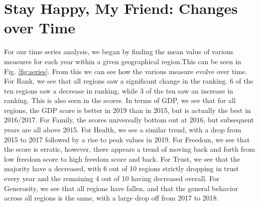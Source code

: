 \documentclass{article}
\begin{document}
\section{Stay Happy, My Friend: Changes over Time}
For our time series analysis, we began by finding the mean value of various measures for each year within a given geographical region.This can be seen in Fig. \ref{fig:series}. From this we can see how the various measure evolve over time. For Rank, we see that all regions saw a significant change in the ranking. 6 of the ten regions saw a decrease in ranking, while 3 of the ten saw an increase in ranking. This is also seen in the scores. In terms of GDP, we see that for all regions, the GDP score is better in 2019 than in 2015, but is actually the best in 2016/2017. For Family, the scores universally bottom out at 2016, but subsequent years are all above 2015. For Health, we see a similar trend, with a drop from 2015 to 2017 followed by a rise to peak values in 2019. For Freedom, we see that the score is erratic, however, there appears a trend of moving back and forth from low freedom score to high freedom score and back. For Trust, we see that the majority have a decreased, with 6 out of 10 regions strictly dropping in trust every year and the remaining 4 out of 10 having decreased overall. For Generosity, we see that all regions have fallen, and that the general behavior across all regions is the same, with a large drop off from 2017 to 2018.\\
\end{document}
